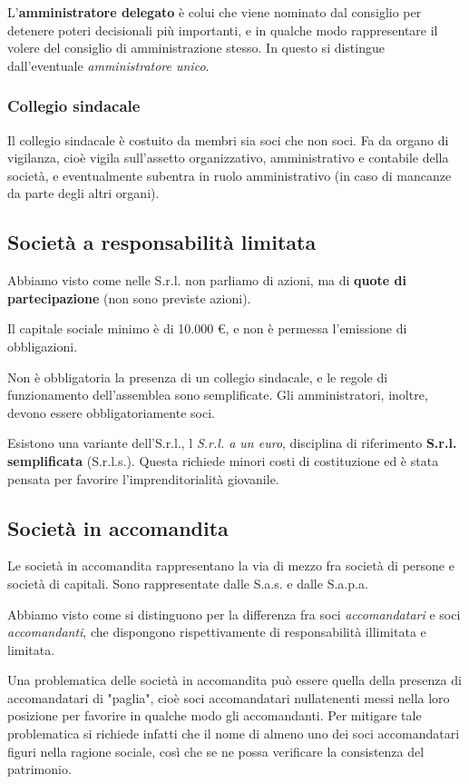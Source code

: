 \documentclass[a4paper,11pt]{article}
\begin{document}
L'\textbf{amministratore delegato} è colui che viene nominato dal consiglio per detenere poteri decisionali più importanti, e in qualche modo rappresentare il volere del consiglio di amministrazione stesso.
In questo si distingue dall'eventuale \textit{amministratore unico}.

\subsubsection{Collegio sindacale}
Il collegio sindacale è costuito da membri sia soci che non soci.
Fa da organo di vigilanza, cioè vigila sull'assetto organizzativo, amministrativo e contabile della società, e eventualmente subentra in ruolo amministrativo (in caso di mancanze da parte degli altri organi). 

\subsection{Società a responsabilità limitata}
Abbiamo visto come nelle S.r.l. non parliamo di azioni, ma di \textbf{quote di partecipazione} (non sono previste azioni).

Il capitale sociale minimo è di 10.000 €, e non è permessa l'emissione di obbligazioni.

Non è obbligatoria la presenza di un collegio sindacale, e le regole di funzionamento dell'assemblea sono semplificate.
Gli amministratori, inoltre, devono essere obbligatoriamente soci.

Esistono una variante dell'S.r.l., l \textit{S.r.l. a un euro}, disciplina di riferimento \textbf{S.r.l. semplificata} (S.r.l.s.).
Questa richiede minori costi di costituzione ed è stata pensata per favorire l'imprenditorialità giovanile.

\subsection{Società in accomandita}
Le società in accomandita rappresentano la via di mezzo fra società di persone e società di capitali.
Sono rappresentate dalle S.a.s. e dalle S.a.p.a.

Abbiamo visto come si distinguono per la differenza fra soci \textit{accomandatari} e soci \textit{accomandanti}, che dispongono rispettivamente di responsabilità illimitata e limitata.

Una problematica delle società in accomandita può essere quella della presenza di accomandatari di "paglia", cioè soci accomandatari nullatenenti messi nella loro posizione per favorire in qualche modo gli accomandanti. 
Per mitigare tale problematica si richiede infatti che il nome di almeno uno dei soci accomandatari figuri nella ragione sociale, così che se ne possa verificare la consistenza del patrimonio.
\end{document}
